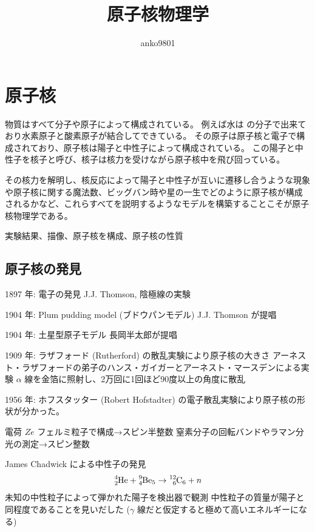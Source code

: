 \documentclass[uplatex,dvipdfmx,a4paper,11pt]{jlreq}
\title{原子核物理学}
\author{anko9801}
\numberwithin{equation}{section}
\theoremstyle{definition}
\begin{document}
\maketitle
\tableofcontents
\clearpage

\section{原子核}
物質はすべて分子や原子によって構成されている。
例えば水は  の分子で出来ており水素原子と酸素原子が結合してできている。
その原子は原子核と電子で構成されており、原子核は陽子と中性子によって構成されている。
この陽子と中性子を核子と呼び、核子は核力を受けながら原子核中を飛び回っている。

その核力を解明し、核反応によって陽子と中性子が互いに遷移し合うような現象や原子核に関する魔法数、ビッグバン時や星の一生でどのように原子核が構成されるかなど、これらすべてを説明するようなモデルを構築することこそが原子核物理学である。

実験結果、描像、原子核を構成、原子核の性質

\subsection{原子核の発見}
1897 年: 電子の発見 J.J. Thomson, 陰極線の実験

1904 年: Plum pudding model (ブドウパンモデル) J.J. Thomson が提唱

1904 年: 土星型原子モデル 長岡半太郎が提唱

1909 年: ラザフォード (Rutherford) の散乱実験により原子核の大きさ
アーネスト・ラザフォードの弟子のハンス・ガイガーとアーネスト・マースデンによる実験
$\alpha$ 線を金箔に照射し、2万回に1回ほど90度以上の角度に散乱

1956 年: ホフスタッター (Robert Hofstadter) の電子散乱実験により原子核の形状が分かった。

電荷 $Ze$
フェルミ粒子で構成→スピン半整数
窒素分子の回転バンドやラマン分光の測定→スピン整数

James Chadwick による中性子の発見
\begin{align}
  \ce{^4_2He} + \ce{^9_4Be_5} \to \ce{^12_6C_6} + n
\end{align}
未知の中性粒子によって弾かれた陽子を検出器で観測
中性粒子の質量が陽子と同程度であることを見いだした
($\gamma$ 線だと仮定すると極めて高いエネルギーになる)
\end{document}
